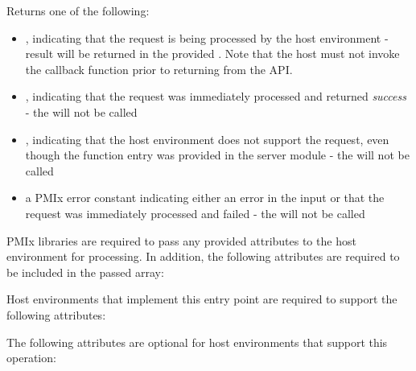 \begin{arglist}
\end{arglist}

Returns one of the following:

\begin{itemize}
    \item {}, indicating that the request is being processed by the host environment - result will be returned in the provided . Note that the host must not invoke the callback function prior to returning from the \ac{API}.
    \item {}, indicating that the request was immediately processed and returned \textit{success} - the  will not be called
    \item {}, indicating that the host environment does not support the request, even though the function entry was provided in the server module - the  will not be called
    \item a PMIx error constant indicating either an error in the input or that the request was immediately processed and failed - the  will not be called
\end{itemize}

\reqattrstart
\ac{PMIx} libraries are required to pass any provided attributes to the host environment for processing. In addition, the following attributes are required to be included in the passed  array:


\divider

Host environments that implement this entry point are required to support the following attributes:


\reqattrend

\optattrstart
The following attributes are optional for host environments that support this operation:

